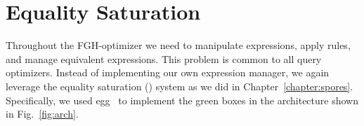 %



\section{Equality Saturation}
\label{sec:semantic-opt}



Throughout the FGH-optimizer we need to manipulate expressions, apply
rules, and manage equivalent expressions.  This problem is common to
all query optimizers.  Instead of implementing our own expression
manager, 
 we again leverage the equality saturation (\eqsat) system 
 as we did in Chapter~\ref{chapter:spores}.
Specifically, we used
egg~\cite{DBLP:journals/pacmpl/WillseyNWFTP21} to implement the green
boxes in the architecture shown in Fig.~\ref{fig:arch}.


